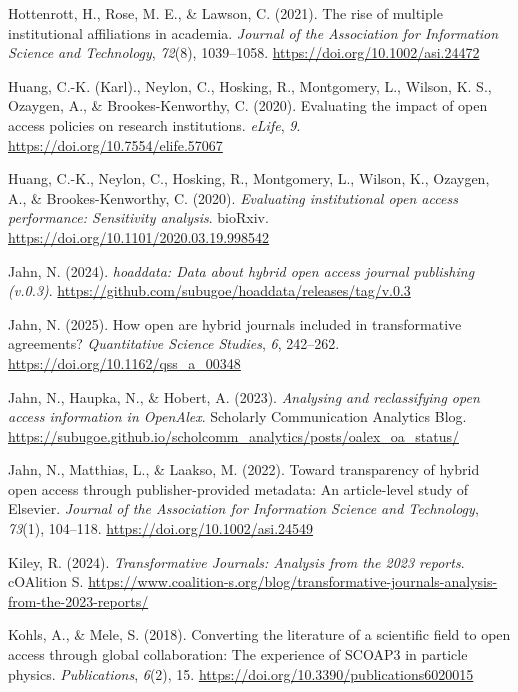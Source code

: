 \documentclass[a4paper,man,floatsintext,longtable,noextraspace,10pt]{apa6}
\newlength{\cslhangindent}
\newenvironment{CSLReferences}[2] %
{\begin{list}{}{%
  \setlength{\itemindent}{0pt}
  \setlength{\leftmargin}{0pt}
  \setlength{\parsep}{0pt}
  \ifodd #1
  \setlength{\leftmargin}{\cslhangindent}
  \setlength{\itemindent}{-1\cslhangindent}
  \fi
  \setlength{\itemsep}{#2\baselineskip}}}
{\end{list}}
\begin{document}
\begin{CSLReferences}{1}{0}
Hottenrott, H., Rose, M. E., \& Lawson, C. (2021). The rise of multiple
institutional affiliations in academia. \emph{Journal of the Association
for Information Science and Technology}, \emph{72}(8), 1039--1058.
\url{https://doi.org/10.1002/asi.24472}

Huang, C.-K. (Karl)., Neylon, C., Hosking, R., Montgomery, L., Wilson,
K. S., Ozaygen, A., \& Brookes-Kenworthy, C. (2020). Evaluating the
impact of open access policies on research institutions. \emph{eLife},
\emph{9}. \url{https://doi.org/10.7554/elife.57067}

Huang, C.-K., Neylon, C., Hosking, R., Montgomery, L., Wilson, K.,
Ozaygen, A., \& Brookes-Kenworthy, C. (2020). \emph{Evaluating
institutional open access performance: Sensitivity analysis}. bioRxiv.
\url{https://doi.org/10.1101/2020.03.19.998542}

Jahn, N. (2024). \emph{{hoaddata}: Data about hybrid open access journal
publishing (v.0.3)}.
\url{https://github.com/subugoe/hoaddata/releases/tag/v.0.3}

Jahn, N. (2025). How open are hybrid journals included in transformative
agreements? \emph{Quantitative Science Studies}, \emph{6}, 242--262.
\url{https://doi.org/10.1162/qss_a_00348}

Jahn, N., Haupka, N., \& Hobert, A. (2023). \emph{Analysing and
reclassifying open access information in OpenAlex}. {Scholarly
Communication Analytics Blog}.
\url{https://subugoe.github.io/scholcomm_analytics/posts/oalex_oa_status/}

Jahn, N., Matthias, L., \& Laakso, M. (2022). Toward transparency of
hybrid open access through publisher-provided metadata: An article-level
study of {Elsevier}. \emph{Journal of the Association for Information
Science and Technology}, \emph{73}(1), 104--118.
\url{https://doi.org/10.1002/asi.24549}

Kiley, R. (2024). \emph{{Transformative Journals}: Analysis from the
2023 reports}. {cOAlition S}.
\url{https://www.coalition-s.org/blog/transformative-journals-analysis-from-the-2023-reports/}

Kohls, A., \& Mele, S. (2018). Converting the literature of a scientific
field to open access through global collaboration: The experience of
SCOAP3 in particle physics. \emph{Publications}, \emph{6}(2), 15.
\url{https://doi.org/10.3390/publications6020015}


\end{CSLReferences}
\end{document}
